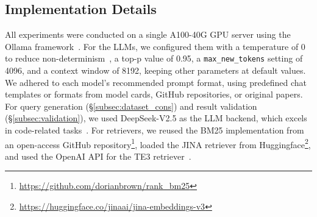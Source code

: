 \subsection{Implementation Details}
\label{subsec:imple_details}
All experiments were conducted on a single A100-40G GPU server using the Ollama framework~\cite{ollama_website}. For the LLMs, we configured them with a temperature of 0 to reduce non-determinism~\cite{ouyang2024empirical}, a top-p value of 0.95, a \texttt{max\_new\_tokens} setting of 4096, and a context window of 8192, keeping other parameters at default values. We adhered to each model's recommended prompt format, using predefined chat templates or formats from model cards, GitHub repositories, or original papers. For query generation (\S\ref{subsec:dataset_cons}) and result validation (\S\ref{subsec:validation}), we used DeepSeek-V2.5 as the LLM backend, which excels in code-related tasks~\cite{DeepSeek2024}.
For retrievers, we reused the BM25 implementation from an open-access GitHub repository\footnote{\url{https://github.com/dorianbrown/rank_bm25}}, loaded the JINA retriever from Huggingface\footnote{\url{https://huggingface.co/jinaai/jina-embeddings-v3}}, and used the OpenAI API for the TE3 retriever~\cite{OpenAI_Embeddings}.
